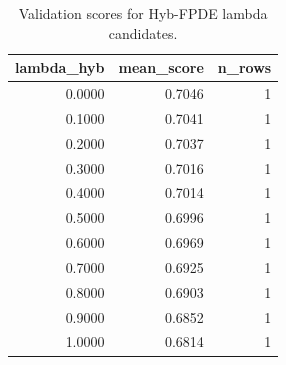 \begin{table}[t]
\caption{Validation scores for Hyb-FPDE lambda candidates.}
\label{tab:lambda_distribution_computed}
\centering
\begin{tabular}{rrr}
\toprule
lambda\_hyb & mean\_score & n\_rows \\
\midrule
0.0000 & 0.7046 & 1 \\
0.1000 & 0.7041 & 1 \\
0.2000 & 0.7037 & 1 \\
0.3000 & 0.7016 & 1 \\
0.4000 & 0.7014 & 1 \\
0.5000 & 0.6996 & 1 \\
0.6000 & 0.6969 & 1 \\
0.7000 & 0.6925 & 1 \\
0.8000 & 0.6903 & 1 \\
0.9000 & 0.6852 & 1 \\
1.0000 & 0.6814 & 1 \\
\bottomrule
\end{tabular}

\end{table}
